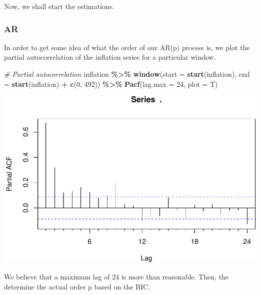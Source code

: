 \documentclass[
]{article}
\newenvironment{Shaded}{\begin{snugshade}}{\end{snugshade}}
\newcommand{\AttributeTok}[1]{\textcolor[rgb]{0.13,0.29,0.53}{#1}}
\newcommand{\CommentTok}[1]{\textcolor[rgb]{0.56,0.35,0.01}{\textit{#1}}}
\newcommand{\DecValTok}[1]{\textcolor[rgb]{0.00,0.00,0.81}{#1}}
\newcommand{\FunctionTok}[1]{\textcolor[rgb]{0.13,0.29,0.53}{\textbf{#1}}}
\newcommand{\NormalTok}[1]{#1}
\newcommand{\SpecialCharTok}[1]{\textcolor[rgb]{0.81,0.36,0.00}{\textbf{#1}}}
\begin{document}
Now, we shall start the estimations.

\hypertarget{ar}{%
\subsubsection{AR}\label{ar}}

In order to get some idea of what the order of our AR(p) process is, we
plot the partial autocorrelation of the inflation series for a
particular window.

\begin{Shaded}
\begin{Highlighting}[]
\CommentTok{\# Partial autocorrelation}
\NormalTok{inflation }\SpecialCharTok{\%\textgreater{}\%}
    \FunctionTok{window}\NormalTok{(}\AttributeTok{start =} \FunctionTok{start}\NormalTok{(inflation), }\AttributeTok{end =} \FunctionTok{start}\NormalTok{(inflation) }\SpecialCharTok{+}
        \FunctionTok{c}\NormalTok{(}\DecValTok{0}\NormalTok{, }\DecValTok{492}\NormalTok{)) }\SpecialCharTok{\%\textgreater{}\%}
    \FunctionTok{Pacf}\NormalTok{(}\AttributeTok{lag.max =} \DecValTok{24}\NormalTok{, }\AttributeTok{plot =}\NormalTok{ T)}
\end{Highlighting}
\end{Shaded}

\includegraphics{Trabalho_Econo4_Q2_files/figure-latex/unnamed-chunk-6-1.pdf}

We believe that a maximum lag of 24 is more than reasonable. Then, the
determine the actual order p based on the BIC.
\end{document}
